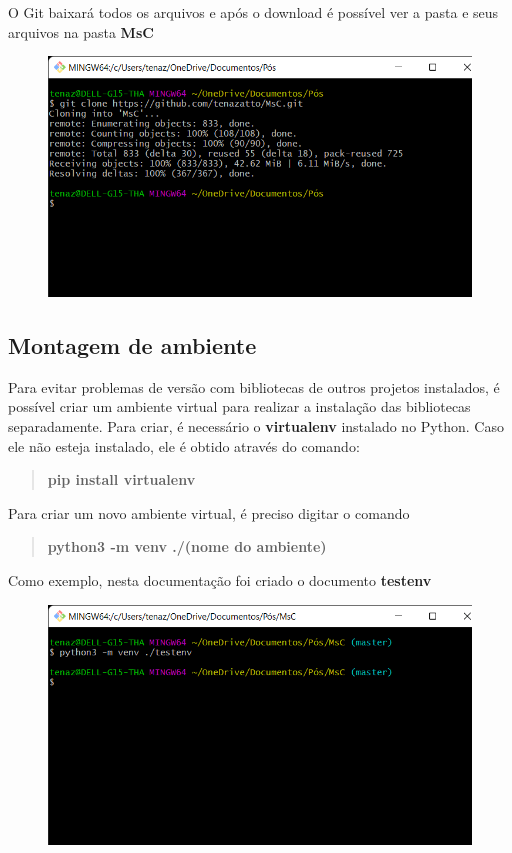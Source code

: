 \documentclass[portugues]{ic-tese}
\begin{document}
O Git baixará todos os arquivos e após o download é possível ver a pasta e seus arquivos na pasta \textbf{MsC}

\begin{figure}[h!]
\centering
\includegraphics[scale=0.4]{images/doc-install/git-clone.png}
\label{fig:DocInstallGitClone}
\end{figure}

\subsection{Montagem de ambiente}

Para evitar problemas de versão com bibliotecas de outros projetos instalados, é possível criar um ambiente virtual para realizar a instalação das bibliotecas separadamente. Para criar, é necessário o \textbf{virtualenv} instalado no Python. Caso ele não esteja instalado, ele é obtido através do comando:

\begin{quote}\textbf{pip install virtualenv}\end{quote}

Para criar um novo ambiente virtual, é preciso digitar o comando

\begin{quote}\textbf{python3 -m venv ./(nome do ambiente)}\end{quote}

Como exemplo, nesta documentação foi criado o documento \textbf{testenv}

\begin{figure}[H]
\centering
\includegraphics[scale=0.4]{images/doc-install/virtualenv-sh.png}
\label{fig:DocInstallVirtualEnvShell}
\end{figure}
\end{document}
